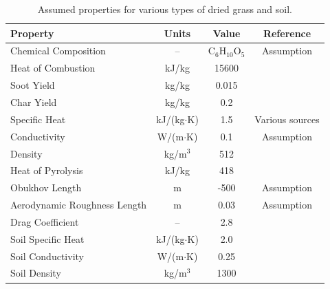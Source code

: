 \begin{table}
\begin{center}
\caption[Assumed properties for dry grass and soil]{Assumed properties for various types of dried grass and soil.}
\label{Assumed_Properties_Grasses}
\begin{tabular}{|l|c|c|c|}
\hline
Property                        & Units                 & Value                     & Reference                             \\ \hline \hline
Chemical Composition            & --                    & C$_6$H$_{10}$O$_5$        & Assumption                            \\ \hline
Heat of Combustion              & kJ/kg                 & 15600                     & \cite{Susott:FS1982}                  \\ \hline
Soot Yield                      & kg/kg                 & 0.015                     & \cite{SFPE:Tewarson}                  \\ \hline
Char Yield                      & kg/kg                 & 0.2                       & \cite{Susott:FS1982}                  \\ \hline
Specific Heat                   & kJ/(kg$\cdot$K)       & 1.5                       & Various sources                       \\ \hline
Conductivity                    & W/(m$\cdot$K)         & 0.1                       & Assumption                            \\ \hline
Density                         & kg/m$^3$              & 512                       & \cite{Rothermel:1972}                 \\ \hline
Heat of Pyrolysis               & kJ/kg                 & 418                       & \cite{Morvan:CF2004}                  \\ \hline
Obukhov Length                  & m                     & -500                      & Assumption                            \\ \hline
Aerodynamic Roughness Length    & m                     & 0.03                      & Assumption                            \\ \hline
Drag Coefficient                & --                    & 2.8                       & \cite{Falkenstein-Smith:2018}         \\ \hline \hline
Soil Specific Heat              & kJ/(kg$\cdot$K)       & 2.0                       & \cite{Farouki:1981}                   \\ \hline
Soil Conductivity               & W/(m$\cdot$K)         & 0.25                      & \cite{Farouki:1981}                   \\ \hline
Soil Density                    & kg/m$^3$              & 1300                      & \cite{Farouki:1981}                   \\ \hline

\end{tabular}
\end{center}
\end{table}


